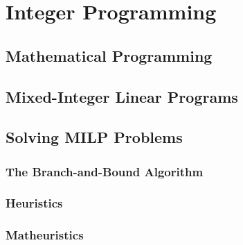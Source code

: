 

\chapter{Integer Programming}\label{chap:integer-programming}

\section{Mathematical Programming}

\section{Mixed-Integer Linear Programs}

\section{Solving MILP Problems}

\subsection{The Branch-and-Bound Algorithm}

\subsection{Heuristics}

\subsection{Matheuristics}

